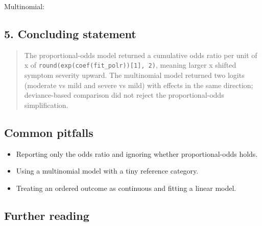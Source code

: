 \documentclass[
]{article}
\newenvironment{Shaded}{\begin{snugshade}}{\end{snugshade}}
\newcommand{\DecValTok}[1]{\textcolor[rgb]{0.00,0.00,0.81}{#1}}
\newcommand{\FunctionTok}[1]{\textcolor[rgb]{0.13,0.29,0.53}{\textbf{#1}}}
\newcommand{\NormalTok}[1]{#1}
\newcommand{\OtherTok}[1]{\textcolor[rgb]{0.56,0.35,0.01}{#1}}
\newcommand{\SpecialCharTok}[1]{\textcolor[rgb]{0.81,0.36,0.00}{\textbf{#1}}}
\providecommand{\tightlist}{%
  \setlength{\itemsep}{0pt}\setlength{\parskip}{0pt}}
\begin{document}
Multinomial:

\begin{Shaded}
\end{Shaded}

\subsection{5. Concluding statement}\label{concluding-statement}

\begin{quote}
The proportional-odds model returned a cumulative odds ratio per unit of
x of \texttt{round(exp(coef(fit\_polr)){[}1{]},\ 2)}, meaning larger x
shifted symptom severity upward. The multinomial model returned two
logits (moderate vs mild and severe vs mild) with effects in the same
direction; deviance-based comparison did not reject the
proportional-odds simplification.
\end{quote}

\subsection{Common pitfalls}\label{common-pitfalls}

\begin{itemize}
\tightlist
\item
  Reporting only the odds ratio and ignoring whether proportional-odds
  holds.
\item
  Using a multinomial model with a tiny reference category.
\item
  Treating an ordered outcome as continuous and fitting a linear model.
\end{itemize}

\subsection{Further reading}\label{further-reading}
\end{document}
